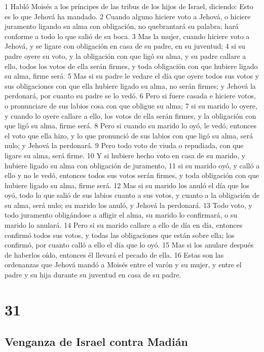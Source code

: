 1 Habló Moisés a los príncipes de las tribus de los hijos de Israel, diciendo: Esto es lo que Jehová ha mandado.
2 Cuando alguno hiciere voto a Jehová, o hiciere juramento ligando su alma con obligación, no quebrantará su palabra; hará conforme a todo lo que salió de su boca.
3 Mas la mujer, cuando hiciere voto a Jehová, y se ligare con obligación en casa de su padre, en su juventud;
4 si su padre oyere su voto, y la obligación con que ligó su alma, y su padre callare a ello, todos los votos de ella serán firmes, y toda obligación con que hubiere ligado su alma, firme será.
5 Mas si su padre le vedare el día que oyere todos sus votos y sus obligaciones con que ella hubiere ligado su alma, no serán firmes; y Jehová la perdonará, por cuanto su padre se lo vedó.
6 Pero si fuere casada e hiciere votos, o pronunciare de sus labios cosa con que obligue su alma;
7 si su marido lo oyere, y cuando lo oyere callare a ello, los votos de ella serán firmes, y la obligación con que ligó su alma, firme será.
8 Pero si cuando su marido lo oyó, le vedó, entonces el voto que ella hizo, y lo que pronunció de sus labios con que ligó su alma, será nulo; y Jehová la perdonará.
9 Pero todo voto de viuda o repudiada, con que ligare su alma, será firme.
10 Y si hubiere hecho voto en casa de su marido, y hubiere ligado su alma con obligación de juramento,
11 si su marido oyó, y calló a ello y no le vedó, entonces todos sus votos serán firmes, y toda obligación con que hubiere ligado su alma, firme será.
12 Mas si su marido los anuló el día que los oyó, todo lo que salió de sus labios cuanto a sus votos, y cuanto a la obligación de su alma, será nulo; su marido los anuló, y Jehová la perdonará.
13 Todo voto, y todo juramento obligándose a afligir el alma, su marido lo confirmará, o su marido lo anulará.
14 Pero si su marido callare a ello de día en día, entonces confirmó todos sus votos, y todas las obligaciones que están sobre ella; los confirmó, por cuanto calló a ello el día que lo oyó.
15 Mas si los anulare después de haberlos oído, entonces él llevará el pecado de ella.
16 Estas son las ordenanzas que Jehová mandó a Moisés entre el varón y su mujer, y entre el padre y su hija durante su juventud en casa de su padre.

\chapter{31}

\section*{Venganza de Israel contra Madián}


